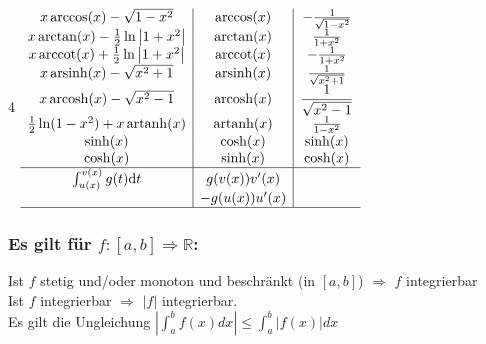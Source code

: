 \documentclass[6pt,a4paper]{scrartcl}
\DeclareMathOperator{\arccot}{arccot}
\begin{document}
\begin{multicols*}{4}
\begin{math}
\begin{array}{c|c|c}
            x\arccos (x)-\sqrt{1-x^2}                           & \arccos(x)                & -\frac{1}{\sqrt{1-x^2}}                  \\
            x\arctan (x)-\frac{1}{2} \ln \left| 1+ x^2 \right|  & \arctan (x)               & \frac{1}{1+x^2}                          \\
            x\arccot (x)+\frac{1}{2} \ln \left| 1+ x^2 \right|  & \arccot (x)               & -\frac{1}{1+x^2}                         \\
            x \operatorname{arsinh} (x) - \sqrt{x^2+1}          & \operatorname{arsinh} (x) & \frac{1}{\sqrt{x^2+1}}                   \\
            x \operatorname{arcosh} (x) - \sqrt{x^2-1}          & \operatorname{arcosh} (x) & \dfrac{1}{\sqrt{x^2-1}}                  \\
            \frac{1}{2}\ln(1-x^2) + x \operatorname{artanh} (x) & \operatorname{artanh} (x) & \frac{1}{1-x^2}                          \\
            \sinh(x)                                            & \cosh(x)                  & \sinh (x)                                \\
            \cosh(x)                                            & \sinh(x)                  & \cosh (x)                                \\ \hline
            \int_{u(x)}^{v(x)}g(t) \mathrm dt                   & g(v(x))v'(x)              &                                          \\
                                                                & -g(u(x))u'(x)             &                                          \\ \hline
        \end{array}
    \end{math}
    \everymath{\textstyle}


    \begin{sectionbox}
        \subsubsection{Es gilt für $f: [a,b] \Rightarrow \mathbb{R}$: }
        Ist $f$ stetig und/oder monoton und beschränkt (in $[a,b]$) $\Rightarrow$ $f$ integrierbar\\
        Ist $f$ integrierbar $\Rightarrow$ $|f|$ integrierbar. \\
        Es gilt die Ungleichung $|\int_a^bf(x)dx| \le \int_a^b|f(x)|dx$
    \end{sectionbox}


\end{multicols*}
\end{document}
